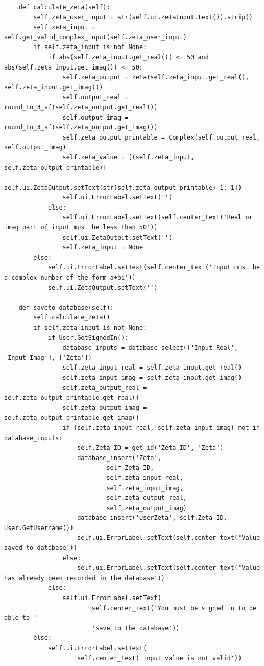 \documentclass{article}
\begin{document}
\begin{lstlisting}
    def calculate_zeta(self):
        self.zeta_user_input = str(self.ui.ZetaInput.text()).strip()
        self.zeta_input = self.get_valid_complex_input(self.zeta_user_input)
        if self.zeta_input is not None:
            if abs(self.zeta_input.get_real()) <= 50 and abs(self.zeta_input.get_imag()) <= 50:
                self.zeta_output = zeta(self.zeta_input.get_real(), self.zeta_input.get_imag())
                self.output_real = round_to_3_sf(self.zeta_output.get_real())
                self.output_imag = round_to_3_sf(self.zeta_output.get_imag())
                self.zeta_output_printable = Complex(self.output_real, self.output_imag)
                self.zeta_value = [(self.zeta_input, self.zeta_output_printable)]
                self.ui.ZetaOutput.setText(str(self.zeta_output_printable)[1:-1])
                self.ui.ErrorLabel.setText('')
            else:
                self.ui.ErrorLabel.setText(self.center_text('Real or imag part of input must be less than 50'))
                self.ui.ZetaOutput.setText('')
                self.zeta_input = None
        else:
            self.ui.ErrorLabel.setText(self.center_text('Input must be a complex number of the form a+bi'))
            self.ui.ZetaOutput.setText('')

    def saveto_database(self):
        self.calculate_zeta()
        if self.zeta_input is not None:
            if User.GetSignedIn():
                database_inputs = database_select(['Input_Real', 'Input_Imag'], ['Zeta'])
                self.zeta_input_real = self.zeta_input.get_real()
                self.zeta_input_imag = self.zeta_input.get_imag()
                self.zeta_output_real = self.zeta_output_printable.get_real()
                self.zeta_output_imag = self.zeta_output_printable.get_imag()
                if (self.zeta_input_real, self.zeta_input_imag) not in database_inputs:
                    self.Zeta_ID = get_id('Zeta_ID', 'Zeta')
                    database_insert('Zeta',
                            self.Zeta_ID,
                            self.zeta_input_real,
                            self.zeta_input_imag,
                            self.zeta_output_real,
                            self.zeta_output_imag)
                    database_insert('UserZeta', self.Zeta_ID, User.GetUsername())
                    self.ui.ErrorLabel.setText(self.center_text('Value saved to database'))
                else:
                    self.ui.ErrorLabel.setText(self.center_text('Value has already been recorded in the database'))
            else:
                self.ui.ErrorLabel.setText(
                        self.center_text('You must be signed in to be able to '
                        'save to the database'))
        else:
            self.ui.ErrorLabel.setText(
                    self.center_text('Input value is not valid'))


\end{lstlisting}
\end{document}
